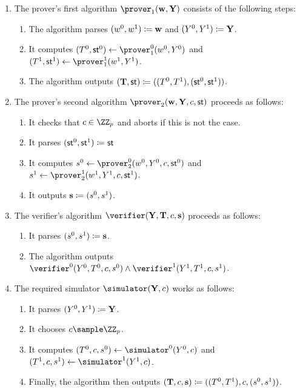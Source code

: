 \documentclass[runningheads]{llncs}
\begin{document}
\begin{enumerate}
  \item
    The prover's first algorithm $\prover_1(\vec \witness, \vec\statement)$ consists of the following steps:
    \begin{enumerate}
      \item
        The algorithm parses $(w^0,w^1)\coloneqq \mathbf {w}$ and $(Y^0,Y^1)\coloneqq \mathbf {Y}$.
      \item
        It computes $(\commitment^0,\st^0)\gets\prover_1^0(\witness^0, \statement^0)$ and $(\commitment^1,\st^1)\gets\prover_1^1(\witness^1, \statement^1)$.
      \item
	The algorithm outputs $(\mathbf {T},\mathsf{st}) \coloneqq ((T^0,  T^1),(\mathsf{st}^0,\mathsf{st}^1))$.
    \end{enumerate}
  \item
    The prover's second algorithm $\prover_2(\vec \witness,\vec \statement,\challenge,\st)$ proceeds as follows:
    \begin{enumerate}
      \item
        It checks that $c\in\ZZ_p$ and aborts if this is not the case.
      \item
	It parses $(\mathsf{st}^0,\mathsf{st}^1)\coloneqq \mathsf{st}$
      \item
        It computes $s^0\gets\prover_2^0(\witness^0,\statement^0,\challenge,\st^0)$ and $s^1\gets\prover_2^1(\witness^1,\statement^1,\challenge,\st^1)$.
      \item
        It outputs $\mathbf {s}\coloneqq(s^0,s^1)$.
    \end{enumerate}
  \item
    The verifier's algorithm $\verifier(\vec \statement, \vec \commitment,\challenge,\vec \response)$ proceeds as follows:
    \begin{enumerate}
      \item
        It  parses $(s^0,s^1)\coloneqq \mathbf {s}$.
      \item
	The algorithm outputs $\verifier^0(\statement^0, \commitment^0,\challenge, \response^0)\land\verifier^1(\statement^1, \commitment^1,\challenge, \response^1)$.
    \end{enumerate}
  \item
    The required simulator $\simulator(\vec Y,c)$ works as follows:
    \begin{enumerate}
      \item
        It parses $(Y^0,Y^1)\coloneqq \mathbf Y$.
      \item
        It chooses $c\sample\ZZ_p$.
      \item
        It computes $(\commitment^0,\challenge,s^0)\gets\simulator^0(\statement^0,c)$ and $(\commitment^1,\challenge,s^1)\gets\simulator^1(\statement^1,c)$.
      \item
        Finally, the algorithm then outputs $(\mathbf {T},c, \mathbf {s})\coloneqq((T^0, T^1),c,(s^0,s^1))$.
    \end{enumerate}
\end{enumerate}
\end{document}
